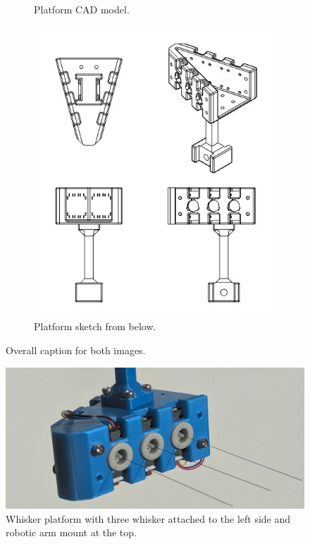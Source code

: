 \begin{figure}[ht]
\begin{subfigure}[b]{0.45\textwidth}
        \caption{Platform CAD model.}
    \end{subfigure}
    \hfill %
    \begin{subfigure}[b]{0.45\textwidth}
        \centering
        \includegraphics[height=0.3\textheight]{figures/platform-sketch}
        \caption{Platform sketch from below.}
    \end{subfigure}
    \caption{Overall caption for both images.}
    \label{fig:platform}
\end{figure}

\begin{figure}[ht]
    \centering
    \includegraphics[width=0.8\textheight]{figures/platform}
    \caption{Whisker platform with three whisker attached to the left side and robotic arm mount at the top.}
    \label{fig:whisker_platform}
\end{figure}


